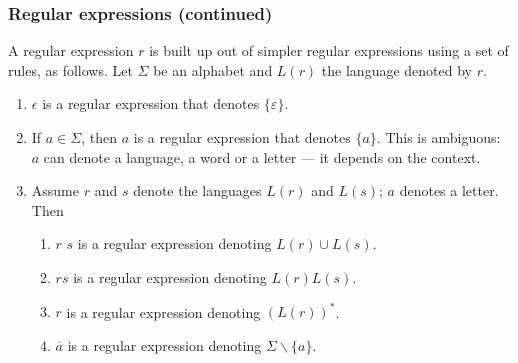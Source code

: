 % 
\begin{frame}
\frametitle{Regular expressions (continued)}

A regular expression \(r\) is built up out of simpler regular
expressions using a set of rules, as follows. Let \(\Sigma\)
be an alphabet and \(L(r)\) the language denoted by \(r\).
\begin{enumerate}

   \item \(\epsilon\) is a regular expression that denotes
     \(\{\varepsilon\}\). \label{regexp_empty}

   \item If \(a \in \Sigma\), then \(a\) is a regular expression that
     denotes \(\{a\}\). This is ambiguous: \(a\) can denote a
     language, a word or a letter --- it depends on the
     context. \label{regexp_sym}

   \item Assume \(r\) and \(s\) denote the languages \(L(r)\) and
     \(L(s)\); \(a\) denotes a letter. Then \label{regexp_rec}
   \begin{enumerate}
    
     \item \(r\) \disj \(s\) is a regular expression
     denoting \(L(r) \cup L(s)\).

     \item \(r s\) is a regular expression denoting \(L(r) L(s)\).

     \item \(r\)\kleene{} is a regular expression
     denoting \((L(r))^{*}\).


     \item \(\overline{a}\) is a regular expression denoting
       \(\Sigma\backslash \{a\}\).

   \end{enumerate}

\end{enumerate}

\end{frame}

